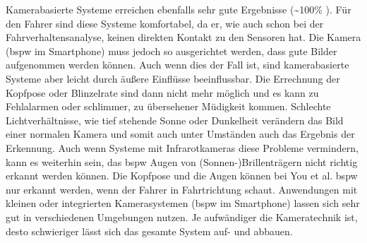 {Kamerabasierte Systeme erreichen ebenfalls sehr gute Ergebnisse (\textasciitilde 100\% \cite{Bergasa_1603553}). Für den Fahrer sind diese Systeme komfortabel, da er, wie auch schon bei der Fahrverhaltensanalyse, keinen direkten Kontakt zu den Sensoren hat. Die Kamera (\acl{bspw} im Smartphone) muss jedoch so ausgerichtet werden, dass gute Bilder aufgenommen werden können. Auch wenn dies der Fall ist, sind kamerabasierte Systeme aber leicht durch äußere Einflüsse beeinflussbar. Die Errechnung der Kopfpose oder Blinzelrate sind dann nicht mehr möglich und es kann zu Fehlalarmen oder schlimmer, zu übersehener Müdigkeit kommen. Schlechte Lichtverhältnisse, wie tief stehende Sonne oder Dunkelheit verändern das Bild einer normalen Kamera und somit auch unter Umständen auch das Ergebnis der Erkennung. Auch wenn Systeme mit Infrarotkameras diese Probleme vermindern, kann es weiterhin sein, das \acl{bspw} Augen von (Sonnen-)Brillenträgern nicht richtig erkannt werden können. Die Kopfpose und die Augen können bei You et al. \cite{You:2013:CAA:2462456.2465428} \acl{bspw} nur erkannt werden, wenn der Fahrer in Fahrtrichtung schaut. Anwendungen mit kleinen oder integrierten Kamerasystemen (\acl{bspw} im Smartphone) lassen sich  sehr gut in verschiedenen Umgebungen nutzen. Je aufwändiger die Kameratechnik ist, desto schwieriger lässt sich das gesamte System auf- und abbauen. \\

}
